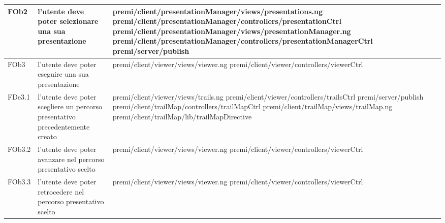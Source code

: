 \begin{longtable}{|l|p{5cm}|p{7cm}|}
\hline
FOb2 & l'utente deve poter selezionare una sua presentazione & \hspace{0pt}premi/client/presentationManager/views/presentations.ng \linebreak \linebreak premi/client/presentationManager/controllers/presentationCtrl \linebreak \linebreak premi/client/presentationManager/views/presentationManager.ng \linebreak \linebreak premi/client/presentationManager/controllers/presentationManagerCtrl \linebreak \linebreak premi/server/publish \\
\hline
FOb3 & l'utente deve poter eseguire una sua presentazione & \hspace{0pt}premi/client/viewer/views/viewer.ng \linebreak \linebreak premi/client/viewer/controllers/viewerCtrl \\
\hline
FDe3.1 & l'utente deve poter scegliere un percorso presentativo precedentemente creato & \hspace{0pt}premi/client/viewer/views/trails.ng \linebreak \linebreak premi/client/viewer/controllers/trailsCtrl \linebreak \linebreak premi/server/publish \linebreak \linebreak premi/client/trailMap/controllers/trailMapCtrl \linebreak \linebreak premi/client/trailMap/views/trailMap.ng \linebreak \linebreak premi/client/trailMap/lib/trailMapDirective \\
\hline
FOb3.2 & l'utente deve poter avanzare nel percorso presentativo scelto & \hspace{0pt}premi/client/viewer/views/viewer.ng \linebreak \linebreak premi/client/viewer/controllers/viewerCtrl \\
\hline
FOb3.3 & l'utente deve poter retrocedere nel percorso presentativo scelto & \hspace{0pt}premi/client/viewer/views/viewer.ng \linebreak \linebreak premi/client/viewer/controllers/viewerCtrl \\

\end{longtable}
